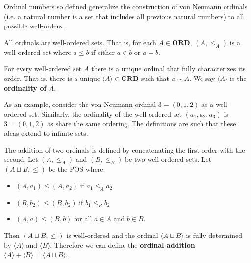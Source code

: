 \documentclass{article}
\newcommand{\marginleft}[1] {\reversemarginpar\marginpar{#1}}
\def\ordinals{\textbf{ORD}}
\def\cardinals{\textbf{CRD}}
\def\ordeq{\sim}
\begin{document}
\begin{remark}
	Ordinal numbers so defined generalize the construction of von Neumann ordinals (i.e. a natural number is a set that includes all previous natural numbers) to all possible well-orders.
\end{remark}

\begin{prop}
	All ordinals are well-ordered sets. That is, for each $A \in \ordinals$, $(A, \leq_A)$ is a well-ordered set where $a \leq b$ if either $a \in b$ or $a = b$.
\end{prop}

\begin{prop}
	For every \marginleft{$\langle A \rangle$} well-ordered set $A$ there is a unique ordinal that fully characterizes its order. That is, there is a unique $\langle A \rangle \in \cardinals$ such that $a \ordeq A$. We say $\langle A \rangle$ is the \textbf{ordinality of $A$}.
\end{prop}

\begin{remark}
	As an example, consider the von Neumann ordinal $3 = (0, 1, 2)$ as a well-ordered set. Similarly, the ordinality of the well-ordered set $(a_1, a_2, a_3)$ is $3 = (0, 1, 2)$ as share the same ordering. The definitions are such that these ideas extend to infinite sets.
\end{remark}

\begin{defn}
	The addition \marginleft{Ordinal addition: $\langle A \rangle + \langle B \rangle$} of two ordinals is defined by concatenating the first order with the second. Let $(A, \leq_A)$ and $(B, \leq_B)$ be two well ordered sets. Let $(A \sqcup B, \leq)$ be the POS where:
	\begin{itemize}
		\item $(A, a_1) \leq (A, a_2)$ if $a_1 \leq_A a_2$
		\item $(B, b_2) \leq (B, b_2)$ if $b_1 \leq_B b_2$
		\item $(A, a) \leq (B, b)$ for all $a \in A$ and $b \in B$.  	
	\end{itemize}
	Then $(A \sqcup B, \leq)$ is well-ordered and the ordinal $\langle A \sqcup B \rangle$ is fully determined by $\langle A \rangle$ and $\langle B \rangle$. Therefore we can define the \textbf{ordinal addition} $\langle A \rangle + \langle B \rangle =  \langle A \sqcup B \rangle$.
\end{defn}
\end{document}
